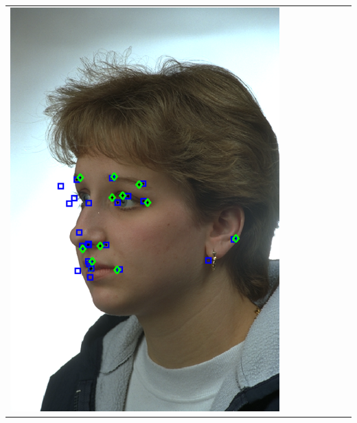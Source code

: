 \documentclass[landscape,final,a0paper,fontscale=0.27065]{baposter}
\begin{document}
\begin{poster}
{{\begin{tabular}{@{}rccccccc@{}}
 \parbox[c]{0.11\linewidth}{\includegraphics[width=\linewidth]{images/l_hl_success_1.pdf}} &

\end{tabular}}}
\end{poster}
\end{document}
